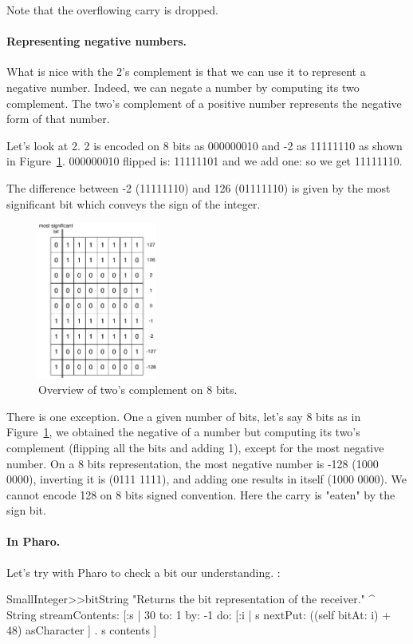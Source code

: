 \documentclass[a4paper,10pt,twoside]{book}
\begin{document}
Note that the overflowing carry is dropped.

\paragraph{Representing negative numbers.}
What is nice with the 2's complement is that we can use it to represent a negative number. Indeed, we can negate a number by computing its two complement. The two's complement of a positive number represents the negative form of that number.

Let's look at 2. 2 is encoded on 8 bits as 000000010 and -2 as 11111110 as shown in Figure~\ref{negativePositive}.
000000010 flipped is: 11111101 and we add one: so we get 11111110.



The difference between  -2 (11111110) and 126 (01111110) is given by the most significant bit which conveys the sign of the integer.

\begin{figure}[h]
\begin{center}
\includegraphics[width=0.35\textwidth]{8bits-Table}
\caption{Overview of two's complement on 8 bits.\label{negativePositive}}
\end{center}
\end{figure}



There is one exception. One a given number of bits, let's say 8 bits as in Figure~\ref{negativePositive},
we obtained the negative of a number but computing its two's complement (flipping all the bits and adding 1), except for the most negative number. On a 8 bits representation, the most negative number is -128 (1000 0000), inverting it is (0111 1111), and adding one results in itself (1000 0000). We cannot encode 128 on 8 bits signed convention. Here the carry is "eaten" by the sign bit. 


\paragraph{In Pharo.}
Let's try with Pharo to check a bit our understanding. 
:
\begin{code}{}
SmallInteger>>bitString
	"Returns the bit representation of the receiver."
	^ String streamContents: [:s | 
		30 to: 1 by: -1 do: [:i | s nextPut: ((self bitAt: i) + 48) asCharacter ] .
		s contents ]
\end{code}
	
\end{document}
